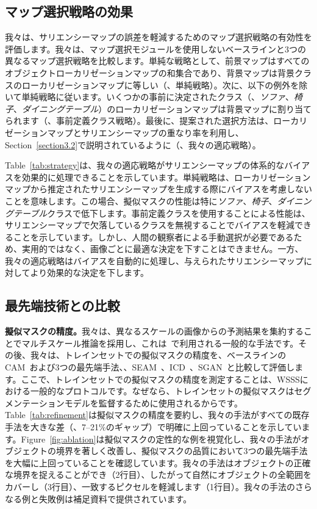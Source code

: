 \documentclass[final]{cvpr}
\begin{document}



\subsection{マップ選択戦略の効果}
我々は、サリエンシーマップの誤差を軽減するためのマップ選択戦略の有効性を評価します。我々は、マップ選択モジュールを使用しないベースラインと3つの異なるマップ選択戦略を比較します。単純な戦略として、前景マップはすべてのオブジェクトローカリゼーションマップの和集合であり、背景マップは背景クラスのローカリゼーションマップに等しい（\ie、単純戦略）。次に、以下の例外を除いて単純戦略に従います。いくつかの事前に決定されたクラス（\eg、\emph{ソファ}、\emph{椅子}、\emph{ダイニングテーブル}）のローカリゼーションマップは背景マップに割り当てられます（\ie、事前定義クラス戦略）。最後に、提案された選択方法は、ローカリゼーションマップとサリエンシーマップの重なり率を利用し、Section~\ref{section3.2}で説明されているように（\ie、我々の適応戦略）。




Table~\ref{tab:strategy}は、我々の適応戦略がサリエンシーマップの体系的なバイアスを効果的に処理できることを示しています。単純戦略は、ローカリゼーションマップから推定されたサリエンシーマップを生成する際にバイアスを考慮しないことを意味します。この場合、擬似マスクの性能は特に\emph{ソファ}、\emph{椅子}、\emph{ダイニングテーブル}クラスで低下します。事前定義クラスを使用することによる性能は、サリエンシーマップで欠落しているクラスを無視することでバイアスを軽減できることを示しています。しかし、人間の観察者による手動選択が必要であるため、実用的ではなく、画像ごとに最適な決定を下すことはできません。一方、我々の適応戦略はバイアスを自動的に処理し、与えられたサリエンシーマップに対してより効果的な決定を下します。

\subsection{最先端技術との比較}
\label{section5.3}

\noindent \textbf{擬似マスクの精度。}我々は、異なるスケールの画像からの予測結果を集約することでマルチスケール推論を採用し、これは~\cite{ahn2018learning,wang2020self}で利用される一般的な手法です。その後、我々は、トレインセットでの擬似マスクの精度を、ベースラインのCAM~\cite{zhou2016learning}および3つの最先端手法、\ie、SEAM~\cite{wang2020self}、ICD~\cite{fan2020learning}、SGAN~\cite{yao2020saliency}と比較して評価します。ここで、トレインセットでの擬似マスクの精度を測定することは、WSSSにおける一般的なプロトコルです。なぜなら、トレインセットの擬似マスクはセグメンテーションモデルを監督するために使用されるからです。Table~\ref{tab:refinement}は擬似マスクの精度を要約し、我々の手法がすべての既存手法を大きな差（\ie、7--21\%のギャップ）で明確に上回っていることを示しています。Figure~\ref{fig:ablation}は擬似マスクの定性的な例を視覚化し、我々の手法がオブジェクトの境界を著しく改善し、擬似マスクの品質において3つの最先端手法を大幅に上回っていることを確認しています。我々の手法はオブジェクトの正確な境界を捉えることができ（2行目）、したがって自然にオブジェクトの全範囲をカバーし（3行目）、一致するピクセルを軽減します（1行目）。我々の手法のさらなる例と失敗例は補足資料で提供されています。
\end{document}
